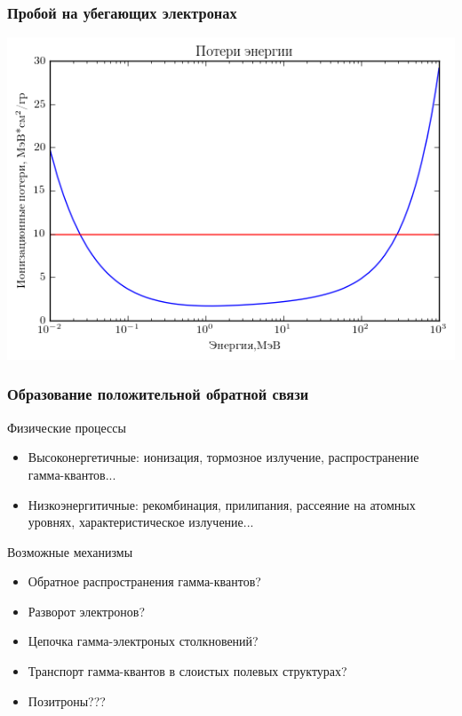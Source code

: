 \documentclass[10pt,pdf,hyperref={unicode}]{beamer}
\begin{document}
\begin{frame}
\frametitle{Пробой на убегающих электронах}
\begin{center}
\includegraphics[width=0.6\paperwidth]{image/fig06.png}
\end{center}
\end{frame}


\begin{frame}
\frametitle{Образование положительной обратной связи}
\begin{block}{Физические процессы}
\begin{itemize}
\item Высоконергетичные: ионизация, тормозное излучение, распространение гамма-квантов...
\item Низкоэнергитичные: рекомбинация, прилипания, рассеяние на атомных уровнях, характеристическое излучение...
\end{itemize}
\end{block}
\begin{block}{Возможные механизмы}
\begin{itemize}
\item Обратное распространения гамма-квантов?
\item Разворот электронов?
\item Цепочка гамма-электроных столкновений?
\item Транспорт гамма-квантов в слоистых полевых структурах?
\item Позитроны???
\end{itemize}
\end{block}
\end{frame}
\end{document}
